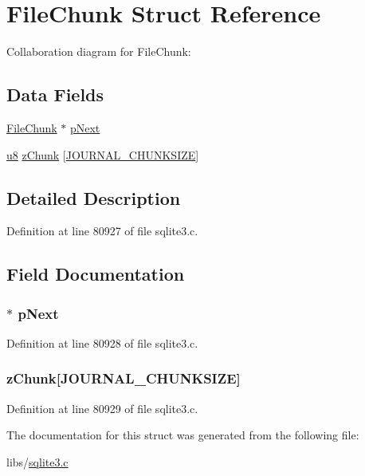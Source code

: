 \hypertarget{struct_file_chunk}{}\section{File\+Chunk Struct Reference}
\label{struct_file_chunk}


Collaboration diagram for File\+Chunk\+:
\subsection*{Data Fields}
\begin{DoxyCompactItemize}
\item 
\hyperlink{struct_file_chunk}{File\+Chunk} $\ast$ \hyperlink{struct_file_chunk_af556b9c31d60b57b9feacd2aa0e75a7c}{p\+Next}
\item 
\hyperlink{sqlite3_8c_a74a0f6424ae628af25f23f0a35f6ead3}{u8} \hyperlink{struct_file_chunk_af13e94e1228e630522b30e1701555d44}{z\+Chunk} \mbox{[}\hyperlink{sqlite3_8c_ae74d0085c858ab7355c3c57fe295489f}{J\+O\+U\+R\+N\+A\+L\+\_\+\+C\+H\+U\+N\+K\+S\+I\+Z\+E}\mbox{]}
\end{DoxyCompactItemize}


\subsection{Detailed Description}


Definition at line 80927 of file sqlite3.\+c.



\subsection{Field Documentation}
\hypertarget{struct_file_chunk_af556b9c31d60b57b9feacd2aa0e75a7c}{}
\subsubsection[{p\+Next}]{$\ast$ p\+Next}\label{struct_file_chunk_af556b9c31d60b57b9feacd2aa0e75a7c}


Definition at line 80928 of file sqlite3.\+c.

\hypertarget{struct_file_chunk_af13e94e1228e630522b30e1701555d44}{}
\subsubsection[{z\+Chunk}]{ z\+Chunk\mbox{[}{\bf J\+O\+U\+R\+N\+A\+L\+\_\+\+C\+H\+U\+N\+K\+S\+I\+Z\+E}\mbox{]}}\label{struct_file_chunk_af13e94e1228e630522b30e1701555d44}


Definition at line 80929 of file sqlite3.\+c.



The documentation for this struct was generated from the following file\+:\begin{DoxyCompactItemize}
\item 
libs/\hyperlink{sqlite3_8c}{sqlite3.\+c}\end{DoxyCompactItemize}
